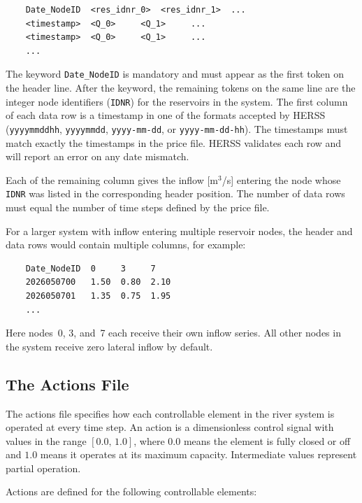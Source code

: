 \documentclass[a4paper, 12pt]{report}
\begin{document}
	\begin{verbatim}
	Date_NodeID  <res_idnr_0>  <res_idnr_1>  ...
	<timestamp>  <Q_0>     <Q_1>     ...
	<timestamp>  <Q_0>     <Q_1>     ...
	...
	\end{verbatim}

	The keyword \texttt{Date\_NodeID} is mandatory and must appear as the first token
	on the header line. After the keyword, the remaining tokens on the same line are
	the integer node identifiers (\texttt{IDNR}) for the reservoirs in the system. 
	The first column of each data row is a timestamp in one of the
	formats accepted by HERSS (\texttt{yyyymmddhh}, \texttt{yyyymmdd},
	\texttt{yyyy-mm-dd}, or \texttt{yyyy-mm-dd-hh}). The timestamps must match
	exactly the timestamps in the price file. HERSS validates each row and will
	report an error on any date mismatch.
	
	Each of the remaining column gives the inflow [m$^3$/s] entering the
	node whose \texttt{IDNR} was listed in the corresponding header position.
	The number of data rows must equal the number of time steps defined by the price file.

	For a larger system with inflow entering multiple reservoir nodes, the header and data rows would contain multiple columns, for example:

	\begin{verbatim}
	Date_NodeID  0     3     7
	2026050700   1.50  0.80  2.10
	2026050701   1.35  0.75  1.95
	...
	\end{verbatim}

	Here nodes~0, 3, and~7 each receive their own inflow series. All other nodes in the system
	receive zero lateral inflow by default.


	
	\subsection{The Actions File}
	\label{sec:actionsfile}

	The actions file specifies how each controllable element in the river system is operated
	at every time step. An action is a dimensionless control signal with values in the range
	$[0.0,\, 1.0]$, where $0.0$ means the element is fully closed or off and $1.0$ means
	it operates at its maximum capacity. Intermediate values represent partial operation.

	Actions are defined for the following controllable elements:
\end{document}
